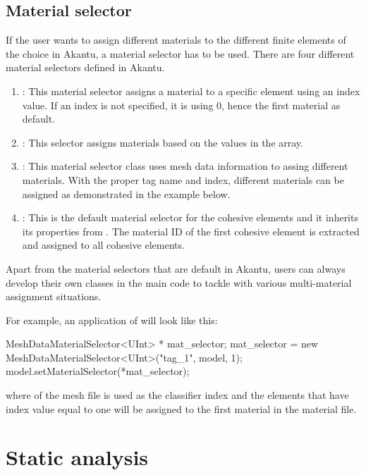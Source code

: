 \subsection{Material selector\label{sect:smm:materialselector}}

If the user wants to assign different materials to the different finite elements of the choice in Akantu, a material selector has to be used. There are four different material selectors defined in Akantu.

\begin{enumerate}
\item {}: This material selector assigns a material to a specific element using an index value. If an index is not specified, it is using 0, hence the first material as default.
\item {}: This selector assigns materials based on the values in the  array.
\item {}: This material selector class uses mesh data information to assing different materials. With the proper tag name and index, different materials can be assigned as demonstrated in the example below.
\item {}: This is the default material selector for the cohesive elements and it inherits its properties from . The material ID of the first cohesive element is extracted and assigned to all cohesive elements.
\end{enumerate}

Apart from the material selectors that are default in Akantu, users can always develop their own classes in the main code to tackle with various multi-material assignment situations.

For example, an application of  will look like this:

\begin{cpp}
MeshDataMaterialSelector<UInt> * mat_selector;
mat_selector = new MeshDataMaterialSelector<UInt>("tag_1", model, 1);
model.setMaterialSelector(*mat_selector);
\end{cpp}

where  of the mesh file is used as the classifier index and the elements that have index value equal to one will be assigned to the first material in the material file.

\section{Static analysis\label{sect:smm:static}}

